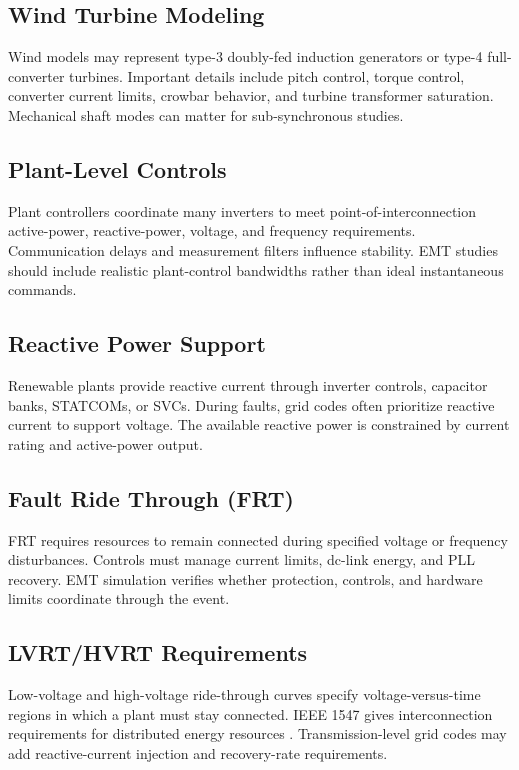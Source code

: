 \documentclass[11pt]{article}
\begin{document}
\subsection{Wind Turbine Modeling}
Wind models may represent type-3 doubly-fed induction generators or type-4 full-converter turbines. Important details include pitch control, torque control, converter current limits, crowbar behavior, and turbine transformer saturation. Mechanical shaft modes can matter for sub-synchronous studies.

\subsection{Plant-Level Controls}
Plant controllers coordinate many inverters to meet point-of-interconnection active-power, reactive-power, voltage, and frequency requirements. Communication delays and measurement filters influence stability. EMT studies should include realistic plant-control bandwidths rather than ideal instantaneous commands.

\subsection{Reactive Power Support}
Renewable plants provide reactive current through inverter controls, capacitor banks, STATCOMs, or SVCs. During faults, grid codes often prioritize reactive current to support voltage. The available reactive power is constrained by current rating and active-power output.

\subsection{Fault Ride Through (FRT)}
FRT requires resources to remain connected during specified voltage or frequency disturbances. Controls must manage current limits, dc-link energy, and PLL recovery. EMT simulation verifies whether protection, controls, and hardware limits coordinate through the event.

\subsection{LVRT/HVRT Requirements}
Low-voltage and high-voltage ride-through curves specify voltage-versus-time regions in which a plant must stay connected. IEEE 1547 gives interconnection requirements for distributed energy resources \cite{ieee1547}. Transmission-level grid codes may add reactive-current injection and recovery-rate requirements.
\end{document}
